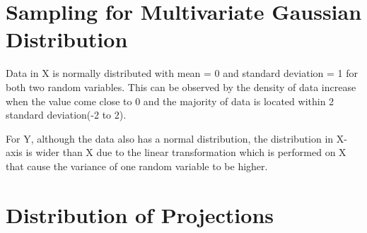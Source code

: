\documentclass{article}
\begin{document}
\section{Sampling for Multivariate Gaussian Distribution}
Data in X is normally distributed with mean = 0 and standard deviation = 1 for both two random variables. This can be observed by the density of data increase when the value come close to 0 and the majority of data is located within 2 standard deviation(-2 to 2).

For Y, although the data also has a normal distribution, the distribution in X-axis is wider than X due to the linear transformation which is performed on X that cause the variance of one random variable to be higher.

\maketitle
\section{Distribution of Projections}
\end{document}
